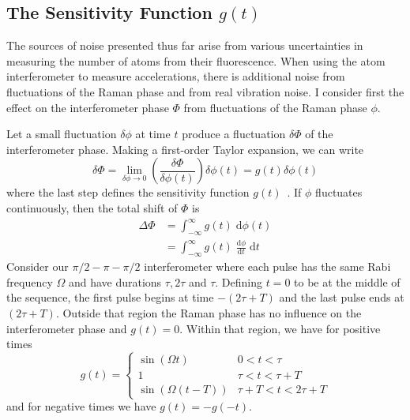 \subsection{The Sensitivity Function $g(t)$}\label{subsec:sens_func}
The sources of noise presented thus far arise from various 
uncertainties in measuring the number of atoms from their
fluorescence. When using the atom interferometer to measure
accelerations, there is additional noise from fluctuations of the
Raman phase and from real vibration noise. I consider first the effect
on the interferometer phase $\Phi$ from fluctuations of the Raman
phase $\phi$.
\par\noindent
Let a small fluctuation $\delta \phi$ at time $t$ produce a
fluctuation $\delta \Phi$ of the interferometer phase. Making a
first-order Taylor expansion, we can write
\begin{equation}
  \delta \Phi = \lim_{\delta\phi \rightarrow 0} \left(\frac{\delta
  \Phi}{\delta \phi(t)}\right) \delta \phi(t) = g(t) \delta \phi(t)
\end{equation}
where the last step defines the sensitivity function
$g(t)$~\cite{Dick1987}. If $\phi$ fluctuates continuously, then the
total shift of $\Phi$ is
\begin{align}
  \Delta\Phi &= \int_{-\infty}^\infty g(t)\;\mathrm{d}\phi(t)
  \nonumber\\
  &= \int_{-\infty}^\infty g(t)\;\frac{\mathrm{d}\phi}{\mathrm{d} t}\;
  \mathrm{d}t
  \label{eq:phase_contrib}
\end{align}
Consider our \(\pi/2-\pi-\pi/2\) interferometer where each pulse has
the same Rabi frequency $\Omega$ and  
have durations \(\tau, 2\tau\) and \(\tau\). Defining \(t=0\) to be at
the middle of the sequence, the first pulse begins at time $-(2 \tau +
T)$ and the last pulse ends at $(2\tau + T)$. Outside that region the
Raman phase has no influence on the interferometer phase and $g(t) =
0$. Within that region, we have for positive times~\cite{Cheinet2008}
\begin{equation}
    g(t) = 
    \begin{cases}
      \sin ( \Omega t) & 0<t<\tau  \\
      1 & \tau <t<\tau +T \\
      \sin (\Omega  (t-T)) & \tau +T<t<2 \tau +T
  \end{cases}
\label{eq:sensitivity_interferometer}
\end{equation}
and for negative times we have $g(t) = - g(-t)$.
